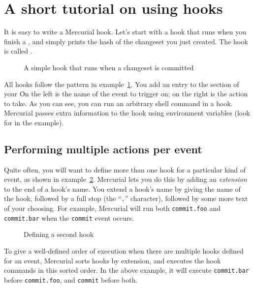 \section{A short tutorial on using hooks}
\label{sec:hook:simple}

It is easy to write a Mercurial hook.  Let's start with a hook that
runs when you finish a , and simply prints the hash of
the changeset you just created.  The hook is called .

\begin{figure}[ht]
  \caption{A simple hook that runs when a changeset is committed}
  \label{ex:hook:init}
\end{figure}

All hooks follow the pattern in example~\ref{ex:hook:init}.  You add
an entry to the  section of your \hgrc\.  On the left
is the name of the event to trigger on; on the right is the action to
take.  As you can see, you can run an arbitrary shell command in a
hook.  Mercurial passes extra information to the hook using
environment variables (look for  in the example).

\subsection{Performing multiple actions per event}

Quite often, you will want to define more than one hook for a
particular kind of event, as shown in example~\ref{ex:hook:ext}.
Mercurial lets you do this by adding an \emph{extension} to the end of
a hook's name.  You extend a hook's name by giving the name of the
hook, followed by a full stop (the ``\texttt{.}'' character), followed
by some more text of your choosing.  For example, Mercurial will run
both \texttt{commit.foo} and \texttt{commit.bar} when the
\texttt{commit} event occurs.

\begin{figure}[ht]
  \caption{Defining a second  hook}
  \label{ex:hook:ext}
\end{figure}

To give a well-defined order of execution when there are multiple
hooks defined for an event, Mercurial sorts hooks by extension, and
executes the hook commands in this sorted order.  In the above
example, it will execute \texttt{commit.bar} before
\texttt{commit.foo}, and \texttt{commit} before both.

